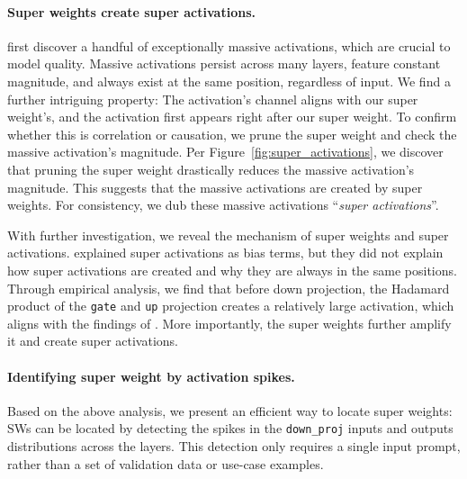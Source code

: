 \documentclass{article} %
\begin{document}
\paragraph{Super weights create super activations.}

\citet{sun2024massive} first discover a handful of exceptionally massive activations, which are crucial to model quality. Massive activations persist across many layers, feature constant magnitude, and always exist at the same position, regardless of input.
We find a further intriguing property: The activation's channel aligns with our super weight's, and the activation first appears right after our super weight. To confirm whether this is correlation or causation, we prune the super weight and check the massive activation's magnitude. Per Figure~\ref{fig:super_activations}, we discover that pruning the super weight drastically reduces the massive activation's magnitude. This suggests that the massive activations are created by super weights. For consistency, we dub these massive activations ``\emph{super activations}''.

With further investigation, we reveal the mechanism of super weights and super activations. \citet{sun2024massive} explained super activations as bias terms, but they did not explain how super activations are created and why they are always in the same positions. Through empirical analysis, we find that before down projection, the Hadamard product of the \texttt{gate} and \texttt{up} projection creates a relatively large activation, which aligns with the findings of \citet{yang2024mitigating}. More importantly, the super weights further amplify it and create super activations. 

\paragraph{Identifying super weight by activation spikes.} Based on the above analysis, we present an efficient way to locate super weights: SWs can be located by detecting the spikes in the \texttt{down\_proj} inputs and outputs distributions across the layers. This detection only requires a single input prompt, rather than a set of validation data or use-case examples.
\end{document}
